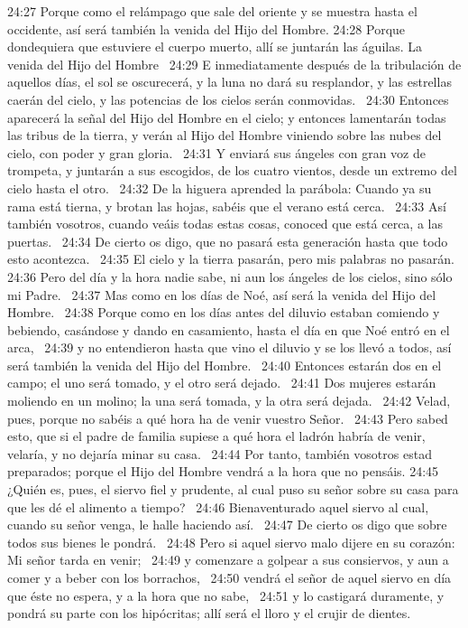 24:27 Porque como el relámpago que sale del oriente y se muestra hasta el occidente, así será también la venida del Hijo del Hombre. 
24:28 Porque dondequiera que estuviere el cuerpo muerto, allí se juntarán las águilas. 
La venida del Hijo del Hombre   
24:29 E inmediatamente después de la tribulación de aquellos días, el sol se oscurecerá, y la luna no dará su resplandor, y las estrellas caerán del cielo, y las potencias de los cielos serán conmovidas.  
24:30 Entonces aparecerá la señal del Hijo del Hombre en el cielo; y entonces lamentarán todas las tribus de la tierra, y verán al Hijo del Hombre viniendo sobre las nubes del cielo, con poder y gran gloria.  
24:31 Y enviará sus ángeles con gran voz de trompeta, y juntarán a sus escogidos, de los cuatro vientos, desde un extremo del cielo hasta el otro.  
24:32 De la higuera aprended la parábola: Cuando ya su rama está tierna, y brotan las hojas, sabéis que el verano está cerca.  
24:33 Así también vosotros, cuando veáis todas estas cosas, conoced que está cerca, a las  
puertas.  
24:34 De cierto os digo, que no pasará esta generación hasta que todo esto acontezca.  
24:35 El cielo y la tierra pasarán, pero mis palabras no pasarán.  
24:36 Pero del día y la hora nadie sabe, ni aun los ángeles de los cielos, sino sólo mi Padre.  
24:37 Mas como en los días de Noé, así será la venida del Hijo del Hombre.  
24:38 Porque como en los días antes del diluvio estaban comiendo y bebiendo, casándose y dando en casamiento, hasta el día en que Noé entró en el arca,  
24:39 y no entendieron hasta que vino el diluvio y se los llevó a todos, así será también la venida del Hijo del Hombre.  
24:40 Entonces estarán dos en el campo; el uno será tomado, y el otro será dejado.  
24:41 Dos mujeres estarán moliendo en un molino; la una será tomada, y la otra será dejada.  
24:42 Velad, pues, porque no sabéis a qué hora ha de venir vuestro Señor.  
24:43 Pero sabed esto, que si el padre de familia supiese a qué hora el ladrón habría de venir, velaría, y no dejaría minar su casa.  
24:44 Por tanto, también vosotros estad preparados; porque el Hijo del Hombre vendrá a la hora que no pensáis. 
24:45 ¿Quién es, pues, el siervo fiel y prudente, al cual puso su señor sobre su casa para que les dé el alimento a tiempo?  
24:46 Bienaventurado aquel siervo al cual, cuando su señor venga, le halle haciendo así.  
24:47 De cierto os digo que sobre todos sus bienes le pondrá.  
24:48 Pero si aquel siervo malo dijere en su corazón: Mi señor tarda en venir;  
24:49 y comenzare a golpear a sus consiervos, y aun a comer y a beber con los borrachos,  
24:50 vendrá el señor de aquel siervo en día que éste no espera, y a la hora que no sabe,  
24:51 y lo castigará duramente, y pondrá su parte con los hipócritas; allí será el lloro y el crujir de dientes. 
